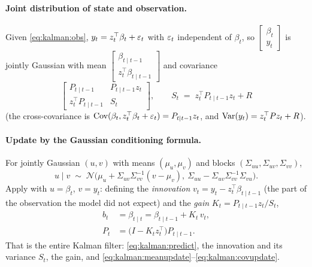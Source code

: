 \paragraph{Joint distribution of state and observation.} Given \eqref{eq:kalman:obs},
$y_t = z_t^{\top}\beta_t + \varepsilon_t$ with $\varepsilon_t$ independent of $\beta_t$, so
$\begin{bmatrix}\beta_t\\ y_t\end{bmatrix}$ is jointly Gaussian with mean
$\begin{bmatrix}\beta_{t\mid t-1}\\ z_t^{\top}\beta_{t\mid t-1}\end{bmatrix}$ and covariance
\begin{equation}
  \begin{bmatrix} P_{t\mid t-1} & P_{t\mid t-1}z_t \\ z_t^{\top}P_{t\mid t-1} & S_t\end{bmatrix},
  \qquad
  S_t \;=\; z_t^{\top}P_{t\mid t-1}z_t + R
  \label{eq:kalman:joint}
\end{equation}
(the cross-covariance is $\operatorname{Cov}(\beta_t, z_t^{\top}\beta_t+\varepsilon_t)=P_{t\mid t-1}z_t$, and
$\operatorname{Var}(y_t)=z_t^{\top}Pz_t+R$).

\paragraph{Update by the Gaussian conditioning formula.} For jointly Gaussian
$(u,v)$ with means $(\mu_u,\mu_v)$ and blocks $(\Sigma_{uu},\Sigma_{uv},\Sigma_{vv})$,
\begin{equation}
  u\mid v \;\sim\; \mathcal N\bigl(\mu_u+\Sigma_{uv}\Sigma_{vv}^{-1}(v-\mu_v),\
  \Sigma_{uu}-\Sigma_{uv}\Sigma_{vv}^{-1}\Sigma_{vu}\bigr).
  \label{eq:gausscond}
\end{equation}
Apply with $u=\beta_t$, $v=y_t$: defining the \emph{innovation}
$v_t = y_t - z_t^{\top}\beta_{t\mid t-1}$ (the part of the observation the model did not
expect) and the \emph{gain} $K_t = P_{t\mid t-1}z_t/S_t$,
\begin{align}
  b_t &= \beta_{t\mid t} = \beta_{t\mid t-1} + K_t\,v_t , \label{eq:kalman:meanupdate}\\
  P_t &= \bigl(I - K_t z_t^{\top}\bigr)P_{t\mid t-1}. \label{eq:kalman:covupdate}
\end{align}
That is the entire Kalman filter: \eqref{eq:kalman:predict}, the innovation and its
variance $S_t$, the gain, and \eqref{eq:kalman:meanupdate}--\eqref{eq:kalman:covupdate}.

